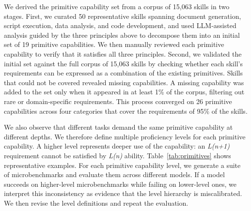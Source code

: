 We derived the primitive capability set from a corpus of 15,063 skills
in two stages. First, we curated 50 representative skills spanning
document generation, script execution, data analysis, and code
development, and used LLM-assisted analysis guided by the three
principles above to decompose them into an initial set of 19
primitive capabilities. We then manually reviewed each primitive capability to verify that
it satisfies all three principles. Second, we validated the initial
set against the full corpus of 15,063 skills by checking whether
each skill's requirements can be expressed as a combination of the
existing primitives. Skills that could not be covered revealed
missing capabilities. A missing capability was added to the set only
when it appeared in at least 1\% of the corpus, filtering out
rare or domain-specific requirements. This process converged on
26 primitive capabilities across four categories that cover the
requirements of 95\% of the skills.

We also observe that different tasks demand the same
primitive capability at different depths. We therefore
define multiple proficiency levels for each primitive capability.
A higher level represents deeper use of the capability: an \emph{L(n+1)} requirement
cannot be satisfied by \emph{L(n)} ability.
Table~\ref{tab:primitives} shows representative examples.
For each primitive capability level, we generate a suite of microbenchmarks
and evaluate them across different models.
If a model succeeds on higher-level microbenchmarks while failing on lower-level ones,
we interpret this inconsistency as evidence that the level hierarchy is miscalibrated.
We then revise the level definitions and repeat the evaluation.

\begin{table}[t]
\setlength{\abovecaptionskip}{4pt}
\setlength{\belowcaptionskip}{0pt}
\centering
\caption{Representative primitive capabilities and their
  proficiency levels. The full catalog contains 26 primitive capabilities
  across four categories.}
\label{tab:primitives}
\end{table}


